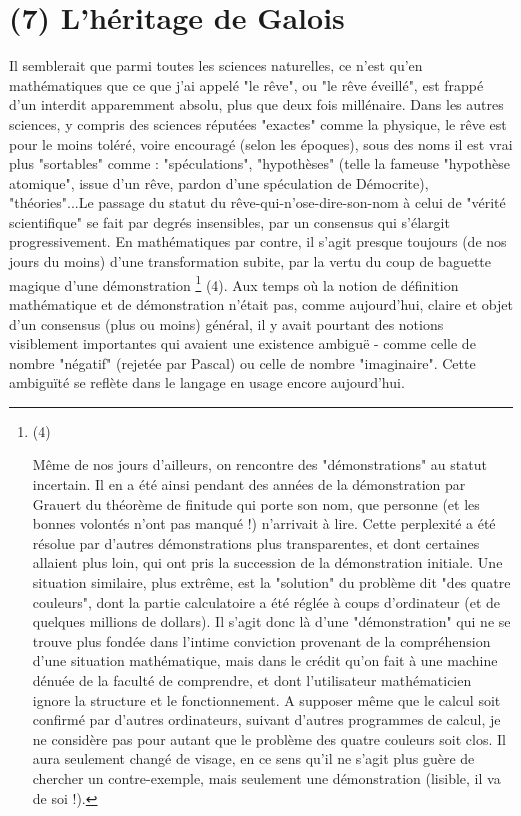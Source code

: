 \section{(7) L'héritage de Galois}

Il semblerait que parmi toutes les sciences naturelles, ce n'est qu'en mathématiques que ce que j'ai appelé "le rêve", ou "le rêve éveillé", est frappé d'un interdit apparemment absolu, plus que deux fois millénaire. Dans les autres sciences, y compris des sciences réputées "exactes" comme la physique, le rêve est pour le moins toléré, voire encouragé (selon les époques), sous des noms il est vrai plus "sortables" comme : "spéculations", "hypothèses" (telle la fameuse "hypothèse atomique", issue d'un rêve, pardon d'une spéculation de Démocrite), "théories"...Le passage du statut du rêve-qui-n'ose-dire-son-nom à celui de "vérité scientifique" se fait par degrés insensibles, par un consensus qui s'élargit progressivement. En mathématiques par contre, il s'agit presque toujours (de nos jours du moins) d'une transformation subite, par la vertu du coup de baguette magique d'une démonstration \footnote{(4)\par Même de nos jours d'ailleurs, on rencontre des "démonstrations" au statut incertain. Il en a été ainsi pendant des années de la démonstration par Grauert du théorème de finitude qui porte son nom, que personne (et les bonnes volontés n'ont pas manqué !) n'arrivait à lire. Cette perplexité a été résolue par d'autres démonstrations plus transparentes, et dont certaines allaient plus loin, qui ont pris la succession de la démonstration initiale. Une situation similaire, plus extrême, est la "solution" du problème dit "des quatre couleurs", dont la partie calculatoire a été réglée à coups d'ordinateur (et de quelques millions de dollars). Il s'agit donc là d'une "démonstration" qui ne se trouve plus fondée dans l'intime conviction provenant de la compréhension d'une situation mathématique, mais dans le crédit qu'on fait à une machine dénuée de la faculté de comprendre, et dont l'utilisateur mathématicien ignore la structure et le fonctionnement. A supposer même que le calcul soit confirmé par d'autres ordinateurs, suivant d'autres programmes de calcul, je ne considère pas pour autant que le problème des quatre couleurs soit clos. Il aura seulement changé de visage, en ce sens qu'il ne s'agit plus guère de chercher un contre-exemple, mais seulement une démonstration (lisible, il va de soi !).} (4). Aux temps où la notion de définition mathématique et de démonstration n'était pas, comme aujourd'hui, claire et objet d'un consensus (plus ou moins) général, il y avait pourtant des notions visiblement importantes qui avaient une existence ambiguë - comme celle de nombre "négatif" (rejetée par Pascal) ou celle de nombre "imaginaire". Cette ambiguïté se reflète dans le langage en usage encore aujourd'hui.

